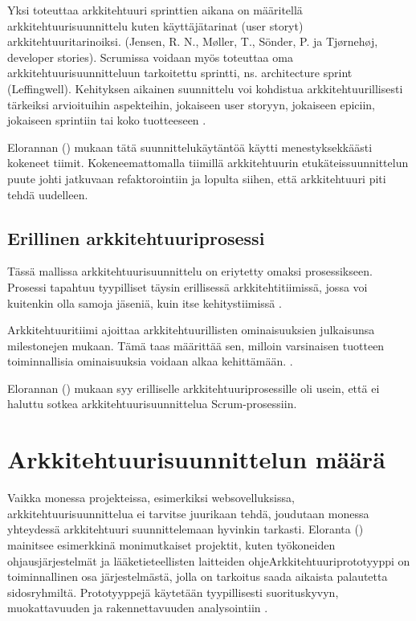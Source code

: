 Yksi toteuttaa arkkitehtuuri sprinttien aikana on määritellä arkkitehtuurisuunnittelu kuten käyttäjätarinat (user storyt) arkkitehtuuritarinoiksi. (Jensen, R. N., Møller, T., Sönder, P. ja Tjørnehøj, developer stories). Scrumissa voidaan myös toteuttaa oma arkkitehtuurisuunnitteluun tarkoitettu sprintti, ns. architecture sprint (Leffingwell). Kehityksen aikainen suunnittelu voi kohdistua arkkitehtuurillisesti tärkeiksi arvioituihin  aspekteihin, jokaiseen user storyyn, jokaiseen epiciin, jokaiseen sprintiin tai koko tuotteeseen \citep{rost_distilling_2015}.

Elorannan (\citeyear{eloranta2015techniques}) mukaan tätä suunnittelukäytäntöä käytti menestyksekkäästi kokeneet tiimit. Kokeneemattomalla tiimillä arkkitehtuurin etukäteissuunnittelun puute johti jatkuvaan refaktorointiin ja lopulta siihen, että arkkitehtuuri piti tehdä uudelleen.


\section{Erillinen arkkitehtuuriprosessi}
Tässä mallissa arkkitehtuurisuunnittelu on eriytetty omaksi prosessikseen. Prosessi tapahtuu tyypilliset täysin erillisessä arkkitehtitiimissä, jossa voi kuitenkin olla samoja jäseniä, kuin itse kehitystiimissä \citep{eloranta2015techniques}.

Arkkitehtuuritiimi ajoittaa arkkitehtuurillisten ominaisuuksien julkaisunsa milestonejen mukaan. Tämä taas määrittää sen, milloin varsinaisen tuotteen toiminnallisia ominaisuuksia voidaan alkaa kehittämään. \citep{eloranta2015techniques}.

Elorannan (\citeyear{eloranta2015techniques}) mukaan syy erilliselle arkkitehtuuriprosessille oli usein, että ei haluttu sotkea arkkitehtuurisuunnittelua Scrum-prosessiin.

\chapter{Arkkitehtuurisuunnittelun määrä}

Vaikka monessa projekteissa, esimerkiksi websovelluksissa, arkkitehtuurisuunnittelua ei tarvitse juurikaan tehdä, joudutaan monessa yhteydessä arkkitehtuuri suunnittelemaan hyvinkin tarkasti. Eloranta (\citeyear{eloranta2015techniques}) mainitsee esimerkkinä monimutkaiset projektit, kuten työkoneiden ohjausjärjestelmät ja lääketieteellisten laitteiden ohjeArkkitehtuuriprototyyppi on toiminnallinen osa järjestelmästä, jolla on tarkoitus saada aikaista palautetta sidosryhmiltä. Prototyyppejä käytetään tyypillisesti suorituskyvyn, muokattavuuden ja rakennettavuuden analysointiin \citep{babar_agile_2013}. 

